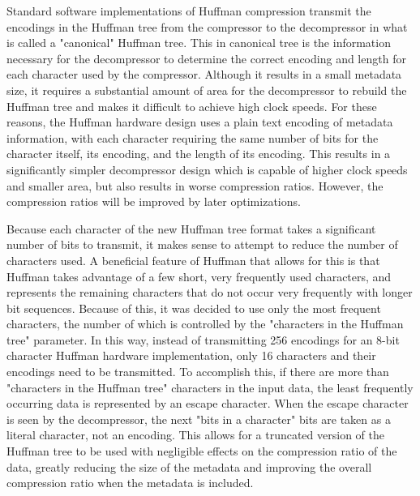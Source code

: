 \documentclass[doublespace,draft,nopageskip]{VTthesis} %
\begin{document}
Standard software implementations of Huffman compression transmit the encodings in the Huffman tree from the compressor to the decompressor in what is called a "canonical" Huffman tree. This in canonical tree is the information necessary for the decompressor to determine the correct encoding and length for each character used by the compressor. Although it results in a small metadata size, it requires a substantial amount of area for the decompressor to rebuild the Huffman tree and makes it difficult to achieve high clock speeds. For these reasons, the Huffman hardware design uses a plain text encoding of metadata information, with each character requiring the same number of bits for the character itself, its encoding, and the length of its encoding. This results in a significantly simpler decompressor design which is capable of higher clock speeds and smaller area, but also results in worse compression ratios. However, the compression ratios will be improved by later optimizations.

Because each character of the new Huffman tree format takes a significant number of bits to transmit, it makes sense to attempt to reduce the number of characters used. A beneficial feature of Huffman that allows for this is that Huffman takes advantage of a few short, very frequently used characters, and represents the remaining characters that do not occur very frequently with longer bit sequences. Because of this, it was decided to use only the most frequent characters, the number of which is controlled by the "characters in the Huffman tree" parameter. In this way, instead of transmitting 256 encodings for an 8-bit character Huffman hardware implementation, only 16 characters and their encodings need to be transmitted. To accomplish this, if there are more than "characters in the Huffman tree" characters in the input data, the least frequently occurring data is represented by an escape character. When the escape character is seen by the decompressor, the next "bits in a character" bits are taken as a literal character, not an encoding. This allows for a truncated version of the Huffman tree to be used with negligible effects on the compression ratio of the data, greatly reducing the size of the metadata and improving the overall compression ratio when the metadata is included.
\end{document}
